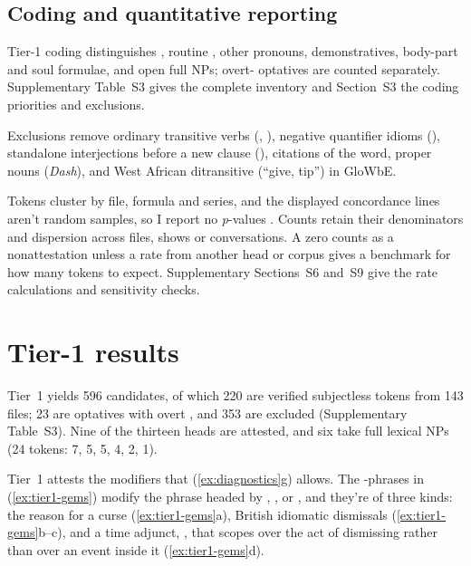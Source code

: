 \documentclass[12pt]{article}
\begin{document}
\subsection{Coding and quantitative reporting}
\label{sec:coding}

Tier-1 coding distinguishes , routine , other pronouns, demonstratives, body-part and soul formulae, and open full NPs; overt- optatives are counted separately. Supplementary Table~S3 gives the complete inventory and Section~S3 the coding priorities and exclusions.

Exclusions remove ordinary transitive verbs (, ), negative quantifier idioms (), standalone interjections before a new clause (), citations of the word, proper nouns (\emph{Dash}), and West African ditransitive  (\enquote{give, tip}) in GloWbE.

Tokens cluster by file, formula and series, and the displayed concordance lines aren't random samples, so I report no \emph{p}-values \citep{kilgarriff2005}. Counts retain their denominators and dispersion across files, shows or conversations. A zero counts as a nonattestation unless a rate from another head or corpus gives a benchmark for how many tokens to expect. Supplementary Sections~S6 and~S9 give the rate calculations and sensitivity checks.

\section{Tier-1 results}
\label{sec:tier1}

Tier~1 yields 596 candidates, of which 220 are verified subjectless tokens from 143 files; 23 are optatives with overt , and 353 are excluded (Supplementary Table~S3). Nine of the thirteen heads are attested, and six take full lexical NPs (24 tokens:  7,  5,  5,  4,  2,  1).


Tier~1 attests the modifiers that (\ref{ex:diagnostics}g) allows. The -phrases in (\ref{ex:tier1-gems}) modify the phrase headed by , ,  or , and they're of three kinds: the reason for a curse (\ref{ex:tier1-gems}a), British idiomatic dismissals (\ref{ex:tier1-gems}b--c), and a time adjunct, , that scopes over the act of dismissing rather than over an event inside it (\ref{ex:tier1-gems}d).
\end{document}
